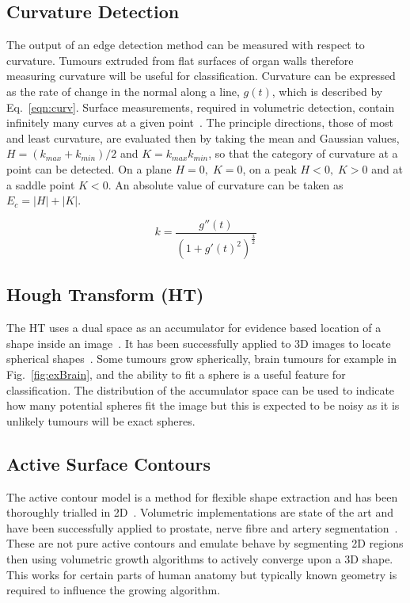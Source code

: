 \documentclass[journal]{IEEEtran}
\begin{document}
\subsection{Curvature Detection}
\label{sec:curvature_detection}
The output of an edge detection method can be measured with respect to curvature.
Tumours extruded from flat surfaces of organ walls therefore measuring curvature will be useful for classification.
Curvature can be expressed as the rate of change in the normal along a line, $g(t)$, which is described by Eq.~\ref{eqn:curv}.
Surface measurements, required in volumetric detection, contain infinitely many curves at a given point~\cite{lohmann1998volumetric}.
The principle directions, those of most and least curvature, are evaluated then by taking the mean and Gaussian values, $H = (k_{max} + k_{min})/2$ and $K = k_{max}k_{min}$, so that the category of curvature at a point can be detected.
On a plane $H = 0,\;K=0$, on a peak $H<0,\;K>0$ and at a saddle point $K<0$.
An absolute value of curvature can be taken as $E_c=|H|+|K|$.

\begin{equation}
	k = \frac{g''(t)}{(1 + g'(t)^2)^{\frac{3}{2}}}
	\label{eqn:curv}
\end{equation}


\subsection{Hough Transform (HT)}

The HT uses a dual space as an accumulator for evidence based location of a shape inside an image~\cite{nixon02feature}.
It has been successfully applied to 3D images to locate spherical shapes~\cite{abuzaina13hough}.
Some tumours grow spherically, brain tumours for example in Fig.~\ref{fig:exBrain}, and the ability to fit a sphere is a useful feature for classification.
The distribution of the accumulator space can be used to indicate how many potential spheres fit the image but this is expected to be noisy as it is unlikely tumours will be exact spheres.





\subsection{Active Surface Contours}

The active contour model is a method for flexible shape extraction and has been thoroughly trialled in 2D~\cite{nixon02feature}.
Volumetric implementations are state of the art and have been successfully applied to prostate, nerve fibre and artery segmentation~\cite{skalski13automatic,muralidhar12active,xiao12carotid}.
These are not pure active contours and emulate behave by segmenting 2D regions then using volumetric growth algorithms to actively converge upon a 3D shape.
This works for certain parts of human anatomy but typically known geometry is required to influence the growing algorithm. 
\end{document}

